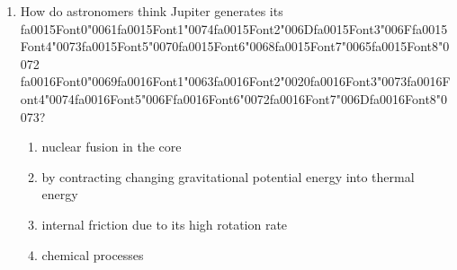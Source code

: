 \documentclass[12pt]{article}
\begin{document}
\begin{enumerate}[label=\arabic*.]
\begin{enumerate}[label=(\alph*)]
    \item Mass 10kg weight 100N
\end{enumerate}
\item How do astronomers think Jupiter generates its {\csname fa0015Font0\endcsname\char"0061}{\csname fa0015Font1\endcsname\char"0074}{\csname fa0015Font2\endcsname\char"006D}{\csname fa0015Font3\endcsname\char"006F}{\csname fa0015Font4\endcsname\char"0073}{\csname fa0015Font5\endcsname\char"0070}{\csname fa0015Font6\endcsname\char"0068}{\csname fa0015Font7\endcsname\char"0065}{\csname fa0015Font8\endcsname\char"0072} {\csname fa0016Font0\endcsname\char"0069}{\csname fa0016Font1\endcsname\char"0063}{\csname fa0016Font2\endcsname\char"0020}{\csname fa0016Font3\endcsname\char"0073}{\csname fa0016Font4\endcsname\char"0074}{\csname fa0016Font5\endcsname\char"006F}{\csname fa0016Font6\endcsname\char"0072}{\csname fa0016Font7\endcsname\char"006D}{\csname fa0016Font8\endcsname\char"0073}?
\begin{enumerate}[label=(\alph*)]
    \item nuclear fusion in the core
    \item by contracting changing gravitational potential energy into thermal energy
    \item internal friction due to its high rotation rate
    \item chemical processes
\end{enumerate}
\end{enumerate}
\end{document}
